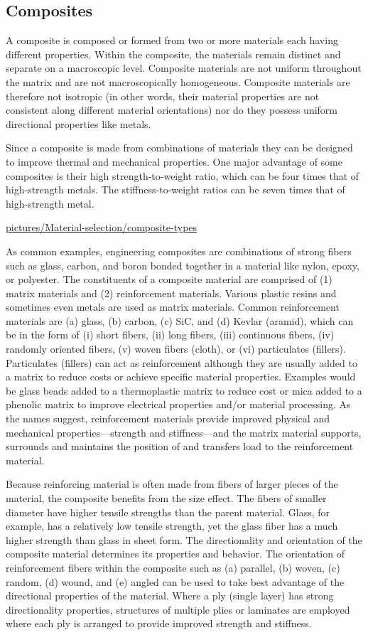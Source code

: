 \documentclass[a4paper,openany,12pt]{book}
\begin{document}
\subsection{Composites}
\label{composites}
A composite is composed or formed from two or more materials each having
different properties. Within the composite, the materials remain
distinct and separate on a macroscopic level. Composite materials are
not uniform throughout the matrix and are not macroscopically
homogeneous. Composite materials are therefore not isotropic (in other
words, their material properties are not consistent along different
material orientations) nor do they possess uniform directional
properties like metals.

Since a composite is made from combinations of materials they can be
designed to improve thermal and mechanical properties. One major
advantage of some composites is their high strength-to-weight ratio,
which can be four times that of high-strength metals. The
stiffness-to-weight ratios can be seven times that of high-strength
metal.


\url{pictures/Material-selection/composite-types}

As common examples, engineering composites are combinations of strong
fibers such as glass, carbon, and boron bonded together in a material
like nylon, epoxy, or polyester. The constituents of a composite
material are comprised of (1) matrix materials and (2) reinforcement
materials. Various plastic resins and sometimes even metals are used as
matrix materials. Common reinforcement materials are (a) glass, (b)
carbon, (c) SiC, and (d) Kevlar (aramid), which can be in the form of
(i) short fibers, (ii) long fibers, (iii) continuous fibers, (iv)
randomly oriented fibers, (v) woven fibers (cloth), or (vi) particulates
(fillers). Particulates (fillers) can act as reinforcement although they
are usually added to a matrix to reduce costs or achieve specific
material properties. Examples would be glass beads added to a
thermoplastic matrix to reduce cost or mica added to a phenolic matrix
to improve electrical properties and/or material processing. As the
names suggest, reinforcement materials provide improved physical and
mechanical properties---strength and stiffness---and the matrix material
supports, surrounds and maintains the position of and transfers load to
the reinforcement material.

Because reinforcing material is often made from fibers of larger pieces
of the material, the composite benefits from the size effect. The fibers
of smaller diameter have higher tensile strengths than the parent
material. Glass, for example, has a relatively low tensile strength, yet
the glass fiber has a much higher strength than glass in sheet form. The
directionality and orientation of the composite material determines its
properties and behavior. The orientation of reinforcement fibers within
the composite such as (a) parallel, (b) woven, (c) random, (d) wound,
and (e) angled can be used to take best advantage of the directional
properties of the material. Where a ply (single layer) has strong
directionality properties, structures of multiple plies or laminates are
employed where each ply is arranged to provide improved strength and
stiffness.
\end{document}
